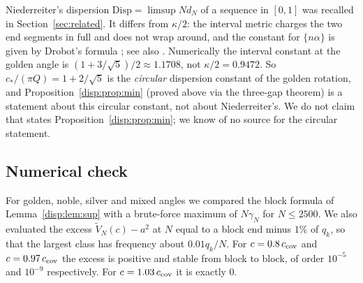 \begin{remark}\label{disp:rem:nied}
Niederreiter's dispersion $\mathrm{Disp}=\limsup Nd_N$ of a sequence in $[0,1]$ was recalled in Section~\ref{sec:related}.
It differs from $\kappa/2$: the interval metric charges the two end segments in full and does not wrap around, and the constant for $\{n\alpha\}$ is
given by Drobot's formula \cite{Dro86}; see also \cite{Tri93}. Numerically the interval constant at the golden angle is $(1+3/\sqrt5)/2\approx1.1708$, not $\kappa/2=0.9472$.
So $c_*/(\pi Q)=1+2/\sqrt5$ is the \emph{circular} dispersion constant of the golden rotation, and Proposition~\ref{disp:prop:min} (proved above via the three-gap theorem)
is a statement about this circular constant, not about Niederreiter's.
We do not claim that \cite{Nie84} states Proposition~\ref{disp:prop:min}; we know of no source for the circular statement.
\end{remark}

\subsection{Numerical check}\label{disp:sec:num}
For golden, noble, silver and mixed angles we compared the block formula of Lemma~\ref{disp:lem:sup} with a brute-force
maximum of $N\gamma_N$ for $N\le2500$. We also evaluated the excess $\widetilde V_N(c)-a^2$ at $N$ equal to a block end
minus $1\%$ of $q_k$, so that the largest class has frequency about $0.01q_k/N$. For $c=0.8\,c_{\rm cov}$ and
$c=0.97\,c_{\rm cov}$ the excess is positive and stable from block to block, of order $10^{-5}$ and $10^{-9}$ respectively.
For $c=1.03\,c_{\rm cov}$ it is exactly $0$.
